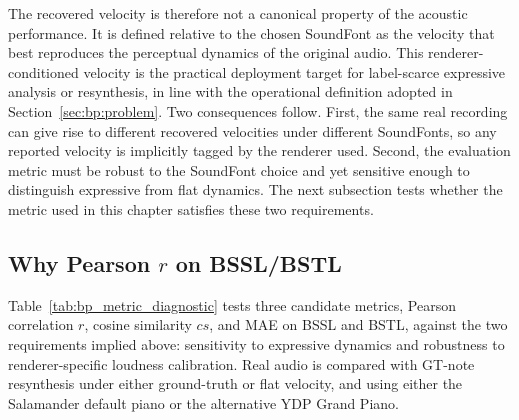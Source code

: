 The recovered velocity is therefore not a canonical property of the acoustic performance. It is defined relative to the chosen SoundFont as the velocity that best reproduces the perceptual dynamics of the original audio. This renderer-conditioned velocity is the practical deployment target for label-scarce expressive analysis or resynthesis, in line with the operational definition adopted in Section~\ref{sec:bp:problem}. Two consequences follow. First, the same real recording can give rise to different recovered velocities under different SoundFonts, so any reported velocity is implicitly tagged by the renderer used. Second, the evaluation metric must be robust to the SoundFont choice and yet sensitive enough to distinguish expressive from flat dynamics. The next subsection tests whether the metric used in this chapter satisfies these two requirements.

\subsection{Why Pearson \texorpdfstring{$r$}{r} on BSSL/BSTL}
\label{ssec:bp:metric_diagnostic}

Table~\ref{tab:bp_metric_diagnostic} tests three candidate metrics, Pearson correlation $r$, cosine similarity $cs$, and MAE on BSSL and BSTL, against the two requirements implied above: sensitivity to expressive dynamics and robustness to renderer-specific loudness calibration. Real audio is compared with GT-note resynthesis under either ground-truth or flat velocity, and using either the Salamander default piano or the alternative YDP Grand Piano.

